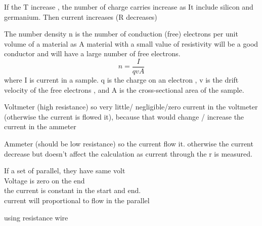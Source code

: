 \documentclass[a4paper]{article}
\begin{document}
\begin{defi}[semiconductor]
If the T increase , the number of charge carries increase as It include silicon and germanium. Then current increases (R decreases)
\end{defi}

\begin{defi}
The number density n is the number of conduction (free)
 electrons per unit volume of a material as A material with a small value of resistivity will be a good conductor and will have a large number of free electrons.
\begin{equation*}
    n=\frac{I}{qvA}
\end{equation*}
where I is current in a sample. q is the charge on an electron , v is the drift velocity of the free electrons , and A is the cross-sectional area of the sample.
\end{defi}

\begin{defi}
Voltmeter (high resistance) so very little/ negligible/zero current in the voltmeter (otherwise the current is flowed it), because that would change / increase the current in the ammeter

Ammeter (should be low resistance) so the current flow it. otherwise the current decrease but doesn't affect the calculation as current through the r is measured.
\end{defi}

\begin{defi}
If a set of parallel, they have same volt\\
Voltage is zero on the end\\
the current is constant in the start and end.\\
current will proportional to flow in the parallel

using resistance wire
\end{defi}
\end{document}
